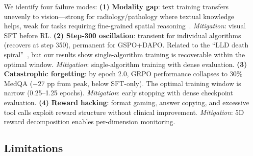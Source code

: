 \documentclass{article}
\begin{document}
We identify four failure modes: \textbf{(1) Modality gap}: text training transfers unevenly to vision---strong for radiology/pathology where textual knowledge helps, weak for tasks requiring fine-grained spatial reasoning~\citep{lai2025medr1}. \emph{Mitigation}: visual SFT before RL. \textbf{(2) Step-300 oscillation}: transient for individual algorithms (recovers at step 350), permanent for GSPO+DAPO. Related to the ``LLD death spiral''~\citep{deng2025lld}, but our results show single-algorithm training is recoverable within the optimal window. \emph{Mitigation}: single-algorithm training with dense evaluation. \textbf{(3) Catastrophic forgetting}: by epoch 2.0, GRPO performance collapses to 30\% MedQA ($-27$ pp from peak, below SFT-only). The optimal training window is narrow (0.25--1.25 epochs). \emph{Mitigation}: early stopping with dense checkpoint evaluation. \textbf{(4) Reward hacking}: format gaming, answer copying, and excessive tool calls exploit reward structure without clinical improvement. \emph{Mitigation}: 5D reward decomposition enables per-dimension monitoring.

\subsection{Limitations}
\label{sec:limitations}
\end{document}
